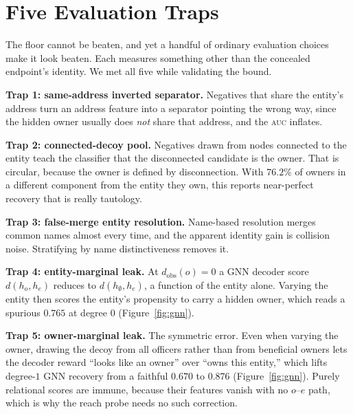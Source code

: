 \documentclass[sigconf]{acmart}
\begin{document}
\section{Five Evaluation Traps}\label{sec:traps}
The floor cannot be beaten, and yet a handful of ordinary evaluation choices make
it look beaten. Each measures something other than the concealed endpoint's
identity. We met all five while validating the bound.

\textbf{Trap 1: same-address inverted separator.} Negatives that share the
entity's address turn an address feature into a separator pointing the wrong way,
since the hidden owner usually does \emph{not} share that address, and the
\textsc{auc} inflates.

\textbf{Trap 2: connected-decoy pool.} Negatives drawn from nodes connected to the
entity teach the classifier that the disconnected candidate is the owner. That is
circular, because the owner is defined by disconnection. With $76.2\%$ of owners
in a different component from the entity they own, this reports near-perfect
recovery that is really tautology.

\textbf{Trap 3: false-merge entity resolution.} Name-based resolution merges
common names almost every time, and the apparent identity gain is collision noise.
Stratifying by name distinctiveness removes it.

\textbf{Trap 4: entity-marginal leak.} At $d_{\mathrm{obs}}(o)=0$ a GNN decoder
score $d(h_o,h_e)$ reduces to $d(h_\emptyset,h_e)$, a function of the entity
alone. Varying the entity then scores the entity's propensity to carry a hidden
owner, which reads a spurious $0.765$ at degree $0$ (Figure~\ref{fig:gnn}).

\textbf{Trap 5: owner-marginal leak.} The symmetric error. Even when varying the
owner, drawing the decoy from all officers rather than from beneficial owners lets
the decoder reward ``looks like an owner'' over ``owns this entity,'' which lifts
degree-$1$ GNN recovery from a faithful $0.670$ to $0.876$
(Figure~\ref{fig:gnn}). Purely relational scores are immune, because their
features vanish with no $o$--$e$ path, which is why the reach probe needs no such
correction.
\end{document}
